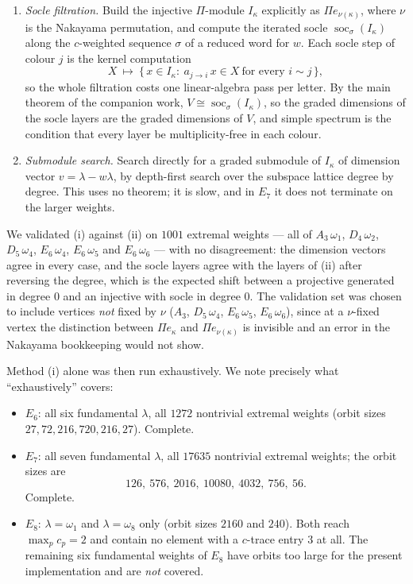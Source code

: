 \documentclass[reqno]{amsart}
\theoremstyle{plain}
\theoremstyle{definition}
\DeclareMathOperator{\soc}{soc}
\newcommand{\la}{\lambda}
\newcommand{\om}{\omega}
\newcommand{\ka}{\kappa}
\newcommand{\Pia}{\Pi}
\begin{document}
\begin{enumerate}[label=(\roman*)]
\item \emph{Socle filtration.}  Build the injective $\Pia$-module $I_\ka$
explicitly as $\Pia e_{\nu(\ka)}$, where $\nu$ is the Nakayama permutation,
and compute the iterated socle $\soc_\sigma(I_\ka)$ along the $c$-weighted
sequence $\sigma$ of a reduced word for $w$.  Each socle step of colour $j$ is
the kernel computation
\[
   X\ \longmapsto\ \{\,x\in I_\ka:\ a_{j\to i}\,x\in X\ \text{for every } i\sim j\,\},
\]
so the whole filtration costs one linear-algebra pass per letter.  By the main
theorem of the companion work, $V\cong\soc_\sigma(I_\ka)$, so the graded
dimensions of the socle layers are the graded dimensions of $V$, and simple
spectrum is the condition that every layer be multiplicity-free in each colour.
\item \emph{Submodule search.}  Search directly for a graded submodule of
$I_\ka$ of dimension vector $v=\la-w\la$, by depth-first search over the
subspace lattice degree by degree.  This uses no theorem; it is slow, and in
$E_7$ it does not terminate on the larger weights.
\end{enumerate}

We validated (i) against (ii) on $1001$ extremal weights --- all of
$A_3\,\om_1$, $D_4\,\om_2$, $D_5\,\om_4$, $E_6\,\om_4$, $E_6\,\om_5$ and
$E_6\,\om_6$ --- with no disagreement: the dimension vectors agree in every
case, and the socle layers agree with the layers of (ii) after reversing the
degree, which is the expected shift between a projective generated in degree
$0$ and an injective with socle in degree $0$.  The validation set was chosen
to include vertices \emph{not} fixed by $\nu$ ($A_3$, $D_5\,\om_4$,
$E_6\,\om_5$, $E_6\,\om_6$), since at a $\nu$-fixed vertex the distinction
between $\Pia e_\ka$ and $\Pia e_{\nu(\ka)}$ is invisible and an error in the
Nakayama bookkeeping would not show.

Method (i) alone was then run exhaustively.  We note precisely what
``exhaustively'' covers:

\begin{itemize}
\item $E_6$: all six fundamental $\la$, all $1272$ nontrivial extremal
weights (orbit sizes $27,72,216,720,216,27$).  Complete.
\item $E_7$: all seven fundamental $\la$, all $17635$ nontrivial extremal
weights; the orbit sizes are
\[126,\ 576,\ 2016,\ 10080,\ 4032,\ 756,\ 56 .\]
Complete.
\item $E_8$: $\la=\om_1$ and $\la=\om_8$ only (orbit sizes $2160$ and $240$).
Both reach $\max_pc_p=2$ and contain no element with a $c$-trace entry $3$ at
all.  The remaining six fundamental weights of $E_8$ have orbits too large for
the present implementation and are \emph{not} covered.
\end{itemize}
\end{document}
